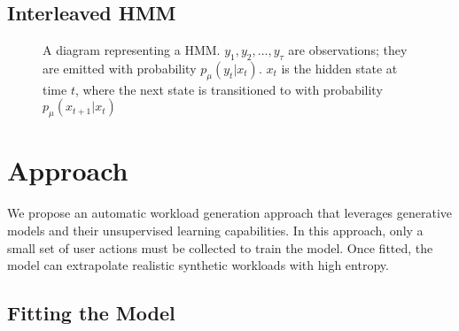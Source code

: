 \subsection{Interleaved HMM}

\begin{figure}
    \caption{A diagram representing a HMM. \(y_1, y_2, ..., y_\tau\) are observations; they are emitted with probability \(p_\mu(y_t | x_t)\). \(x_t\) is the hidden state at time \(t\), where the next state is transitioned to with probability \(p_\mu(x_{t+1} | x_t)\)}
    \label{fig:hmm}
    \vspace{2ex}
\end{figure}

\section{Approach}\label{sec:approach}

We propose an automatic workload generation approach that leverages generative models and their unsupervised learning capabilities. In this approach, only a small set of user actions must be collected to train the model. Once fitted, the model can extrapolate realistic synthetic workloads with high entropy.

\subsection{Fitting the Model}

